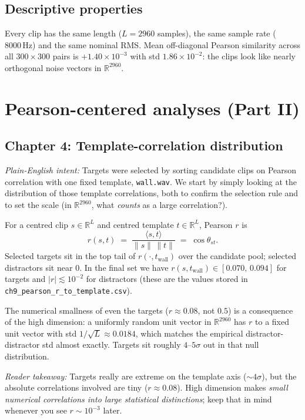 \documentclass[11pt]{article}
\newcommand{\pintent}[1]{\par\medskip\noindent\textit{Plain-English intent:} #1\par\smallskip}
\newcommand{\pkey}[1]{\par\medskip\noindent\textit{Reader takeaway:} #1\par\smallskip}
\begin{document}
\subsection{Descriptive properties}

Every clip has the same length ($L = 2960$ samples), the same sample
rate ($8000\,\mathrm{Hz}$) and the same nominal RMS.  Mean off-diagonal
Pearson similarity across all $300 \times 300$ pairs is
$+1.40 \times 10^{-3}$ with std $1.86 \times 10^{-2}$:  the clips look
like nearly orthogonal noise vectors in $\mathbb R^{2960}$.

\section{Pearson-centered analyses (Part II)}

\subsection{Chapter 4: Template-correlation distribution}
\pintent{Targets were selected by sorting candidate clips on Pearson correlation
with one fixed template, \texttt{wall.wav}. We start by simply looking at the
distribution of those template correlations, both to confirm the selection rule
and to set the scale (in $\mathbb R^{2960}$, what \emph{counts} as a large
correlation?).}

For a centred clip $s \in \mathbb R^L$ and centred template
$t \in \mathbb R^L$, Pearson $r$ is
\begin{equation}
  r(s, t)
  \;=\;
  \frac{\langle s, t \rangle}{\|s\|\,\|t\|}
  \;=\;
  \cos \theta_{st}.
\end{equation}
Selected targets sit in the top tail of $r(\cdot, t_{\text{wall}})$ over
the candidate pool; selected distractors sit near $0$.  In the final set
we have $r(s, t_{\text{wall}}) \in [0.070,\, 0.094]$ for targets and
$|r| \lesssim 10^{-2}$ for distractors (these are the values stored in
\texttt{ch9\_pearson\_r\_to\_template.csv}).

The numerical smallness of even the targets ($r \approx 0.08$, not
$0.5$) is a consequence of the high dimension: a uniformly random unit
vector in $\mathbb R^{2960}$ has $r$ to a fixed unit vector with std
$1/\sqrt{L} \approx 0.0184$, which matches the empirical
distractor-distractor std almost exactly.  Targets sit roughly
$4$--$5\sigma$ out in that null distribution.
\pkey{Targets really are extreme on the template axis ($\sim 4\sigma$), but
the absolute correlations involved are tiny ($r\approx 0.08$). High dimension
makes \emph{small numerical correlations into large statistical
distinctions}; keep that in mind whenever you see $r \sim 10^{-3}$ later.}
\end{document}

